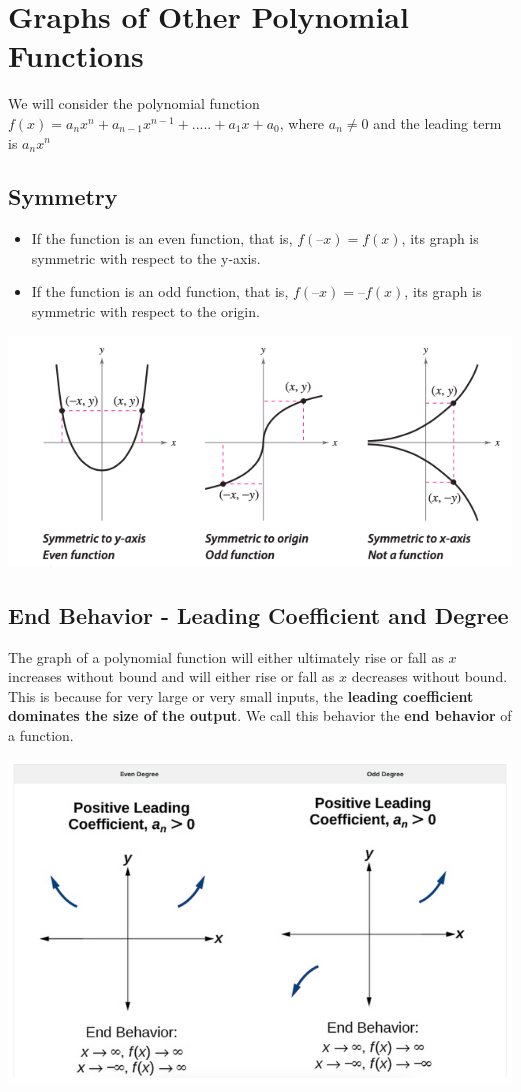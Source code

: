 \documentclass{book}
\begin{document}
	\section{Graphs of Other Polynomial Functions}
	
	We will consider the polynomial function $f(x) = a_nx^n + a_{n-1}x^{n-1} + .....+ a_1x + a_0$, where $a_n \neq 0$ and the leading term is $a_nx^n$
	
	\subsection{Symmetry}
	
	\begin{itemize}
		\item If the function is an even function, that is, $f(–x) = f(x)$, its graph is symmetric with respect to the y-axis.
		\item If the function is an odd function, that is, $f(–x) = –f(x)$, its graph is symmetric with respect to the origin.
	\end{itemize}
	
	\includegraphics[scale=0.5]{symmetry}
	
	\subsection{End Behavior - Leading Coefficient and Degree}
	
	The graph of a polynomial function will either ultimately rise or fall as $x$ increases without bound and will either rise or fall as $x$ decreases without bound. This is because for very large or very small inputs, the \textbf{ leading coefficient dominates the size of the output}. We call this behavior the \textbf{end behavior} of a function.
	
	\includegraphics[scale=0.5]{evenodd1}
	
\end{document}
